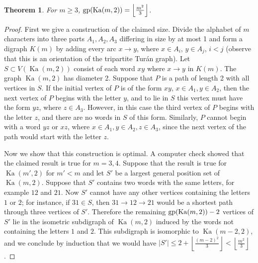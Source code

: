 \documentclass[a4paper,12pt]{article}
\newtheorem{theorem}{Theorem}[section]
\theoremstyle{definition}
\newcommand{\gp}{{\rm gp}}
\DeclareMathOperator{\Ka}{Ka}
\begin{document}
	\begin{theorem}\label{thm:Kautz}
		For $m \geq 3$, $\gp (\Ka(m,2)) = \left \lfloor \frac{m^2}{3} \right \rfloor $.
	\end{theorem}
	\begin{proof}
		First we give a construction of the claimed size. Divide the alphabet of $m$ characters into three parts $A_1,A_2,A_3$ differing in size by at most 1 and form a digraph $K(m)$ by adding every arc $x \rightarrow y$, where $x \in A_i$, $y \in A_j$, $i < j$ (observe that this is an orientation of the tripartite Tur\'{a}n graph). Let $S \subset V(\Ka (m,2))$ consist of each word $xy$ where $x \rightarrow y$ in $K(m)$. The graph $\Ka (m,2)$ has diameter 2. Suppose that $P$ is a path of length 2 with all vertices in $S$. If the initial vertex of $P$ is of the form $xy$, $x \in A_1, y \in A_2$, then the next vertex of $P$ begins with the letter $y$, and to lie in $S$ this vertex must have the form $yz$, where $z \in A_3$. However, in this case the third vertex of $P$ begins with the letter $z$, and there are no words in $S$ of this form. Similarly, $P$ cannot begin with a word $yz$ or $xz$, where $x \in A_1, y \in A_2, z \in A_3$, since the next vertex of the path would start with the letter $z$. 
		
		Now we show that this construction is optimal. A computer check showed that the claimed result is true for $m =3,4$. Suppose that the result is true for $\Ka (m',2)$ for $m' < m$ and let $S'$ be a largest general position set of $\Ka (m,2)$. Suppose that $S'$ contains two words with the same letters, for example $12$ and $21$. Now $S'$ cannot have any other vertices containing the letters $1$ or $2$; for instance, if $31 \in S$, then $31 \rightarrow 12 \rightarrow 21$ would be a shortest path through three vertices of $S'$. Therefore the remaining $\gp (\Ka (m,2))-2$ vertices of $S'$ lie in the isometric subdigraph of $\Ka (m,2)$ induced by the words not containing the letters $1$ and $2$. This subdigraph is isomorphic to $\Ka (m-2,2)$, and we conclude by induction that we would have $|S'| \leq 2+\left \lfloor \frac{(m-2)^2}{3} \right \rfloor < \left \lfloor \frac{m^2}{3} \right \rfloor$. 
		

\end{proof}
\end{document}
